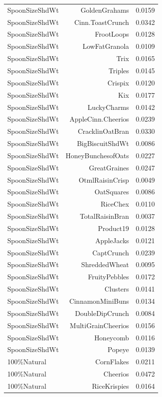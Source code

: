 \begin{longtable}{@{}lrr@{}}
SpoonSizeShdWt & GoldenGrahams & 0.0159 \\
SpoonSizeShdWt & Cinn.ToastCrunch & 0.0342 \\
SpoonSizeShdWt & FrootLoops & 0.0128 \\
SpoonSizeShdWt & LowFatGranola & 0.0109 \\
SpoonSizeShdWt & Trix & 0.0165 \\
SpoonSizeShdWt & Triples & 0.0145 \\
SpoonSizeShdWt & Crispix & 0.0120 \\
SpoonSizeShdWt & Kix & 0.0177 \\
SpoonSizeShdWt & LuckyCharms & 0.0142 \\
SpoonSizeShdWt & AppleCinn.Cheerios & 0.0239 \\
SpoonSizeShdWt & CracklinOatBran & 0.0330 \\
SpoonSizeShdWt & BigBiscuitShdWt & 0.0086 \\
SpoonSizeShdWt & HoneyBunchesofOats & 0.0227 \\
SpoonSizeShdWt & GreatGraines & 0.0247 \\
SpoonSizeShdWt & OtmlRaisinCrisp & 0.0049 \\
SpoonSizeShdWt & OatSquares & 0.0086 \\
SpoonSizeShdWt & RiceChex & 0.0110 \\
SpoonSizeShdWt & TotalRaisinBran & 0.0037 \\
SpoonSizeShdWt & Product19 & 0.0128 \\
SpoonSizeShdWt & AppleJacks & 0.0121 \\
SpoonSizeShdWt & CaptCrunch & 0.0239 \\
SpoonSizeShdWt & ShreddedWheat & 0.0095 \\
SpoonSizeShdWt & FruityPebbles & 0.0172 \\
SpoonSizeShdWt & Clusters & 0.0141 \\
SpoonSizeShdWt & CinnamonMiniBuns & 0.0134 \\
SpoonSizeShdWt & DoubleDipCrunch & 0.0084 \\
SpoonSizeShdWt & MultiGrainCheerios & 0.0156 \\
SpoonSizeShdWt & Honeycomb & 0.0116 \\
SpoonSizeShdWt & Popeye & 0.0139 \\
100\%Natural & CornFlakes & 0.0211 \\
100\%Natural & Cheerios & 0.0472 \\
100\%Natural & RiceKrispies & 0.0164 \\

\end{longtable}
